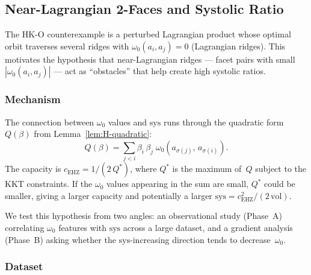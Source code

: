 %
%
%

\subsection{Near-Lagrangian 2-Faces and Systolic Ratio}
\label{sec:omega-obstacle}

The HK-O counterexample is a perturbed Lagrangian product whose
optimal orbit traverses several ridges with $\omega_0(a_i, a_j) = 0$
(Lagrangian ridges).
This motivates the hypothesis that near-Lagrangian ridges --- facet
pairs with small $|\omega_0(a_i, a_j)|$ --- act as ``obstacles'' that
help create high systolic ratios.

\subsubsection*{Mechanism}

The connection between $\omega_0$ values and $\mathrm{sys}$ runs through
the quadratic form $Q(\beta)$ from Lemma~\ref{lem:H-quadratic}:
\[
  Q(\beta)
  = \sum_{j < i} \beta_i\,\beta_j\;\omega_0(a_{\sigma(j)},\, a_{\sigma(i)}).
\]
The capacity is $c_{\mathrm{EHZ}} = 1/(2\,Q^*)$, where $Q^*$ is the
maximum of~$Q$ subject to the KKT constraints.
If the $\omega_0$ values appearing in the sum are small, $Q^*$ could be
smaller, giving a larger capacity and potentially a larger
$\mathrm{sys} = c_{\mathrm{EHZ}}^2 / (2\,\mathrm{vol})$.

We test this hypothesis from two angles: an observational study
(Phase~A) correlating $\omega_0$ features with $\mathrm{sys}$ across a
large dataset, and a gradient analysis (Phase~B) asking whether the
$\mathrm{sys}$-increasing direction tends to decrease~$\omega_0$.

\subsubsection*{Dataset}

